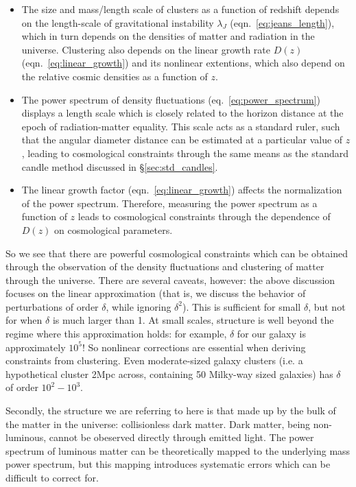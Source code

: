 \begin{itemize}
  \item The size and mass/length scale of clusters as a function of redshift
    depends on the length-scale of gravitational instability $\lambda_J$
    (eqn.~\ref{eq:jeans_length}),
    which in turn depends on the densities of matter and radiation in the
    universe.  Clustering also depends on the linear growth rate
    $D(z)$ (eqn.~\ref{eq:linear_growth}) and its nonlinear extentions,
    which also depend on the relative cosmic densities as a function of $z$.
  \item The power spectrum of density fluctuations (eq.~\ref{eq:power_spectrum})
    displays a length scale which is closely related to the horizon distance
    at the epoch of radiation-matter equality.  This scale acts as a standard
    ruler, such that the angular diameter distance can be estimated at a
    particular value of $z$, leading to cosmological constraints through the
    same means as the standard candle method discussed in
    \S\ref{sec:std_candles}.
  \item The linear growth factor (eqn.~\ref{eq:linear_growth}) affects the
    normalization of the power spectrum.  Therefore, measuring the power
    spectrum as a function of $z$ leads to cosmological constraints
    through the dependence of $D(z)$ on cosmological parameters.
\end{itemize}

So we see that there are powerful cosmological constraints which can be
obtained through the observation of the density fluctuations and clustering
of matter through the universe.  There are several caveats, however:
the above discussion focuses on the linear approximation (that is, we
discuss the behavior of perturbations of order $\delta$, while ignoring
$\delta^2$).  This is sufficient for small $\delta$, but not for when
$\delta$ is much larger than 1.  At small scales, structure is well beyond
the regime where this approximation holds: for example, $\delta$ for our
galaxy is approximately $10^5$!  So nonlinear corrections are essential when
deriving constraints from clustering.  Even moderate-sized galaxy clusters
(i.e. a hypothetical cluster 2Mpc across, containing 50 Milky-way
sized galaxies) has $\delta$ of order $10^2-10^3$.

Secondly, the structure we are referring to here is that made up by the bulk
of the matter in the universe: collisionless dark matter.  Dark matter,
being non-luminous, cannot be obeserved directly through emitted light.
The power spectrum of luminous matter can be theoretically mapped to the
underlying mass power spectrum, but this mapping introduces systematic
errors which can be difficult to correct for.

